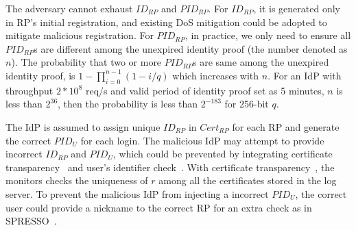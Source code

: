 


 The adversary cannot exhaust $ID_{RP}$ and $PID_{RP}$.
For $ID_{RP}$, it is generated only in RP's initial registration, and existing DoS mitigation  could be adopted to mitigate malicious registration.
For $PID_{RP}$,  in practice, we only need to ensure all $PID_{RP}$s are different among the unexpired identity proof (the number denoted as $n$). The probability
that two or more  $PID_{RP}$s are same among the unexpired identity proof, is $1-\prod_{i=0}^{n-1}(1-i/q)$ which increases with $n$. 
For an IdP with throughput $2*10^8$ req/s and valid period of identity proof set as 5 minutes, $n$ is less than $2^{36}$, then the probability is less than $2^{-183}$ for 256-bit $q$.

 The IdP is assumed to assign unique $ID_{RP}$ in $Cert_{RP}$ for each RP and generate the correct $PID_U$ for each login. The malicious IdP may attempt to provide incorrect $ID_{RP}$ and $PID_U$, which could be prevented by integrating certificate transparency~\cite{rfc6962} and user's identifier check~\cite{SPRESSO}. With certificate transparency~\cite{rfc6962}, the monitors  checks the uniqueness of $r$ among all the certificates stored in the log server. To prevent the malicious IdP from injecting a incorrect $PID_U$, the correct user could provide a nickname to the correct RP for an extra check as in SPRESSO~\cite{SPRESSO}.
  


